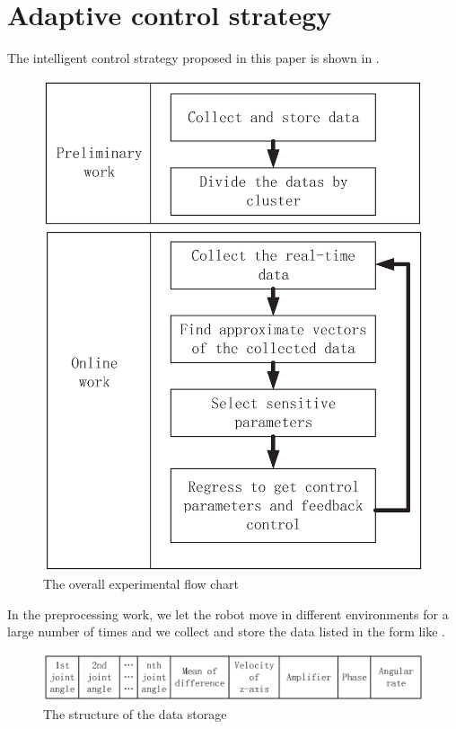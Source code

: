 \section{Adaptive control strategy}

The intelligent control strategy proposed in this paper is shown in .
\begin{figure}[H]
	\centering
	\includegraphics[width=.8\linewidth]{fig/mainwork/stepMap}
	\caption{The overall experimental flow chart}
\end{figure}

 In the preprocessing work, we let the robot move in different environments for a large number of times and we collect and store the data listed in the form like .
\begin{figure}[H]
	\centering
	\includegraphics[width=\linewidth]{fig/mainwork/data}
	\caption{The structure of the data storage}
\end{figure}

